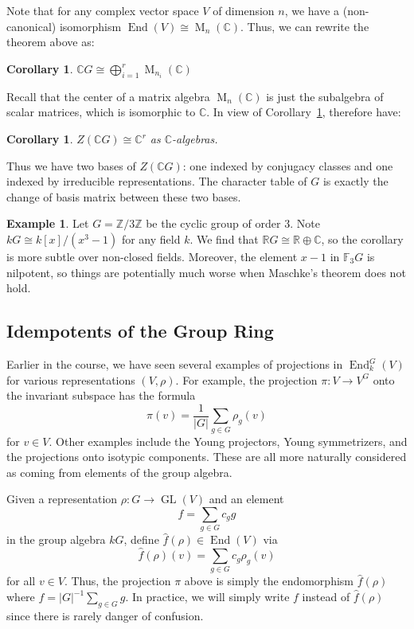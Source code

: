 \documentclass[12pt]{article}
\theoremstyle{plain}
\newtheorem{corollary}[theorem]{Corollary}
\theoremstyle{definition}
\newtheorem{example}[theorem]{Example}
\theoremstyle{remark}
\numberwithin{equation}{section}
\begin{document}
Note that for any complex vector space $V$ of dimension $n$, we have
a (non-canonical) isomorphism
$\operatorname{End}(V) \cong \operatorname{M}_n(\mathbb{C})$.
Thus, we can rewrite the theorem above as:  

\begin{corollary} \label{cor:fourier_as_matrices}
$\displaystyle
\mathbb{C}G \cong \bigoplus_{i=1}^r \operatorname{M}_{n_i}(\mathbb{C})$
\end{corollary}

Recall that the center of a matrix algebra
$\operatorname{M}_n(\mathbb{C})$ is just the subalgebra of scalar
matrices, which is isomorphic to $\mathbb{C}$.
In view of Corollary~\ref{cor:fourier_as_matrices},
therefore have:

\begin{corollary} \label{cor:CGcenter}
$\displaystyle Z(\mathbb{C}G) \cong \mathbb{C}^r$
as $\mathbb{C}$-algebras.
\end{corollary}

Thus we have two bases of $Z(\mathbb{C}G)$: one indexed by conjugacy
classes and one indexed by irreducible representations.
The character table of $G$ is exactly the change of basis matrix between
these two bases.

\begin{example}
Let $G = \mathbb{Z}/3\mathbb{Z}$ be the cyclic group of order $3$.
Note $kG \cong k[x]/(x^3-1)$ for any field $k$.
We find that $\mathbb{R}G \cong \mathbb{R} \oplus \mathbb{C}$,
so the corollary is more subtle over non-closed fields.
Moreover, the element $x-1$ in $\mathbb{F}_3G$ is nilpotent,
so things are potentially much worse when Maschke's theorem does not
hold.
\end{example}

\subsection{Idempotents of the Group Ring}

Earlier in the course, we have seen several examples of projections in
$\operatorname{End}_k^G(V)$ for various representations $(V,\rho)$.
For example, the projection $\pi : V \to V^G$ onto the invariant
subspace has the formula
\[
\pi(v) = \frac{1}{|G|} \sum_{g \in G} \rho_g(v)
\]
for $v \in V$.
Other examples include the Young projectors, Young symmetrizers,
and the projections onto isotypic components.
These are all more naturally considered as coming from elements
of the group algebra.

Given a representation $\rho : G \to \operatorname{GL}(V)$
and an element
\[
f = \sum_{g \in G} c_g g
\]
in the group algebra $kG$,
define $\widehat{f}(\rho) \in \operatorname{End}(V)$ via
\[
\widehat{f}(\rho)(v) = \sum_{g \in G} c_g \rho_g(v)
\]
for all $v \in V$.
Thus, the projection $\pi$ above is simply the endomorphism
$\widehat{f}(\rho)$
where $f = |G|^{-1} \sum_{g \in G} g$.
In practice, we will simply write $f$ instead of $\widehat{f}(\rho)$
since there is rarely danger of confusion.
\end{document}
